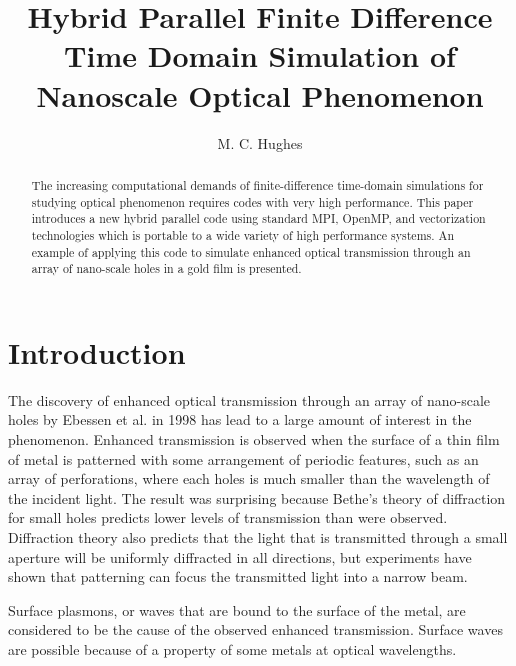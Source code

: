 \documentclass{acesconference}
\begin{document}
\title{Hybrid Parallel Finite Difference Time Domain Simulation of
  Nanoscale Optical Phenomenon}
\author{M. C. Hughes}
\address{Electrical and Computer Engineering\\
University of Victoria\\
Victoria, British Columbia, Canada\\
Email: mhughe@uvic.ca
}

\maketitle

\begin{abstract}
  The increasing computational demands of finite-difference
  time-domain simulations for studying optical phenomenon requires
  codes with very high performance. This paper introduces a new hybrid
  parallel code using standard MPI, OpenMP, and vectorization
  technologies which is portable to a wide variety of high performance
  systems. An example of applying this code to simulate enhanced
  optical transmission through an array of nano-scale holes in a gold
  film is presented. 
\end{abstract}


\section{Introduction}
The discovery of enhanced optical transmission through an array of
nano-scale holes by Ebessen et al. \cite{ebessen1998} in 1998 has lead
to a large amount of interest in the phenomenon. Enhanced transmission
is observed when the surface of a thin film of metal is patterned with
some arrangement of periodic features, such as an array of
perforations, where each holes is much smaller than the wavelength of
the incident light. The result was surprising because Bethe's theory
of diffraction for small holes \cite{bethe1944} predicts lower levels
of transmission than were observed. Diffraction theory also predicts
that the light that is transmitted through a small aperture will be
uniformly diffracted in all directions, but experiments have shown
that patterning can focus the transmitted light into a narrow
beam. 

Surface plasmons, or waves that are bound to the surface of the metal,
are considered to be the cause of the observed enhanced
transmission. Surface waves are possible because of a property
of some metals at optical wavelengths. 
\end{document}
